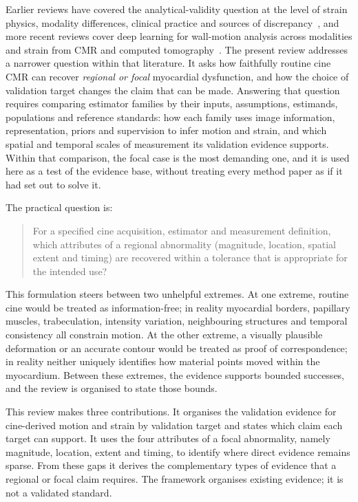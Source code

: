 Earlier reviews have covered the analytical-validity question at the level of strain physics, modality differences, clinical practice and sources of discrepancy~\cite{amzulescu2019,smiseth2025}, and more recent reviews cover deep learning for wall-motion analysis across modalities and strain from CMR and computed tomography~\cite{monfared2026review,hussein2026review}. The present review addresses a narrower question within that literature. It asks how faithfully routine cine CMR can recover \emph{regional or focal} myocardial dysfunction, and how the choice of validation target changes the claim that can be made. Answering that question requires comparing estimator families by their inputs, assumptions, estimands, populations and reference standards: how each family uses image information, representation, priors and supervision to infer motion and strain, and which spatial and temporal scales of measurement its validation evidence supports. Within that comparison, the focal case is the most demanding one, and it is used here as a test of the evidence base, without treating every method paper as if it had set out to solve it.

The practical question is:

\begin{quote}
For a specified cine acquisition, estimator and measurement definition, which attributes of a regional abnormality (magnitude, location, spatial extent and timing) are recovered within a tolerance that is appropriate for the intended use?
\end{quote}

This formulation steers between two unhelpful extremes. At one extreme, routine cine would be treated as information-free; in reality myocardial borders, papillary muscles, trabeculation, intensity variation, neighbouring structures and temporal consistency all constrain motion. At the other extreme, a visually plausible deformation or an accurate contour would be treated as proof of correspondence; in reality neither uniquely identifies how material points moved within the myocardium. Between these extremes, the evidence supports bounded successes, and the review is organised to state those bounds.

This review makes three contributions. It organises the validation evidence for cine-derived motion and strain by validation target and states which claim each target can support. It uses the four attributes of a focal abnormality, namely magnitude, location, extent and timing, to identify where direct evidence remains sparse. From these gaps it derives the complementary types of evidence that a regional or focal claim requires. The framework organises existing evidence; it is not a validated standard.


